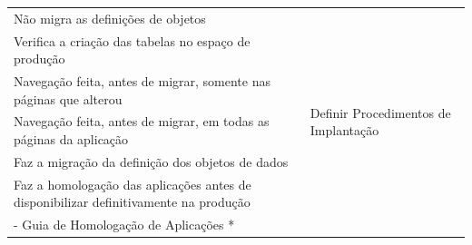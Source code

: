 \begin{longtable}{|m{8.0cm}|m{8.0cm}|}
Não migra as definições de objetos                                                                                                &                                                                                                                                                                                                            \\ \cline{1-1}
Verifica a criação das tabelas no espaço de produção                                                                              &                                                                                                                                                                                                            \\ \hline
Navegação feita, antes de migrar, somente nas páginas que alterou                                                                 & \multirow{3}{*}{Definir Procedimentos de Implantação }                                                                                                                                                    \\ \cline{1-1}
Navegação feita, antes de migrar, em todas as páginas da aplicação                                                                &                                                                                                                                                                                                            \\ \cline{1-1}
Faz a migração da definição dos objetos de dados                                                                                  &                                                                                                                                                                                                            \\ \hline
Faz a homologação das aplicações antes de disponibilizar definitivamente na produção  & \begin{tabular}{m{7.6cm}}- Homologar Aplicação *\\- Guia de Homologação de Aplicações *\end{tabular}                                                                                                        \\ \hline
\end{longtable}


